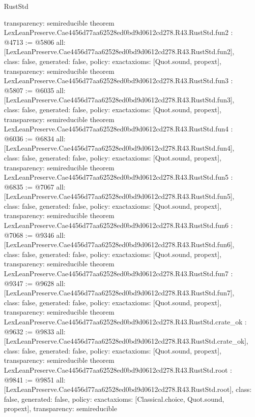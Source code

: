 \begin{lexlean}{RustStd}
\begin{coremodule}
{  transparency: semireducible
}
theorem LexLeanPreserve.Cae4456d77aa62528ed0bd9d0612cd278.R43.RustStd.fun2 : @4713 := @5806 {
  all: [LexLeanPreserve.Cae4456d77aa62528ed0bd9d0612cd278.R43.RustStd.fun2],
  class: false,
  generated: false,
  policy: exact{axioms: [Quot.sound, propext]},
  transparency: semireducible
}
theorem LexLeanPreserve.Cae4456d77aa62528ed0bd9d0612cd278.R43.RustStd.fun3 : @5807 := @6035 {
  all: [LexLeanPreserve.Cae4456d77aa62528ed0bd9d0612cd278.R43.RustStd.fun3],
  class: false,
  generated: false,
  policy: exact{axioms: [Quot.sound, propext]},
  transparency: semireducible
}
theorem LexLeanPreserve.Cae4456d77aa62528ed0bd9d0612cd278.R43.RustStd.fun4 : @6036 := @6834 {
  all: [LexLeanPreserve.Cae4456d77aa62528ed0bd9d0612cd278.R43.RustStd.fun4],
  class: false,
  generated: false,
  policy: exact{axioms: [Quot.sound, propext]},
  transparency: semireducible
}
theorem LexLeanPreserve.Cae4456d77aa62528ed0bd9d0612cd278.R43.RustStd.fun5 : @6835 := @7067 {
  all: [LexLeanPreserve.Cae4456d77aa62528ed0bd9d0612cd278.R43.RustStd.fun5],
  class: false,
  generated: false,
  policy: exact{axioms: [Quot.sound, propext]},
  transparency: semireducible
}
theorem LexLeanPreserve.Cae4456d77aa62528ed0bd9d0612cd278.R43.RustStd.fun6 : @7068 := @9346 {
  all: [LexLeanPreserve.Cae4456d77aa62528ed0bd9d0612cd278.R43.RustStd.fun6],
  class: false,
  generated: false,
  policy: exact{axioms: [Quot.sound, propext]},
  transparency: semireducible
}
theorem LexLeanPreserve.Cae4456d77aa62528ed0bd9d0612cd278.R43.RustStd.fun7 : @9347 := @9628 {
  all: [LexLeanPreserve.Cae4456d77aa62528ed0bd9d0612cd278.R43.RustStd.fun7],
  class: false,
  generated: false,
  policy: exact{axioms: [Quot.sound, propext]},
  transparency: semireducible
}
theorem LexLeanPreserve.Cae4456d77aa62528ed0bd9d0612cd278.R43.RustStd.crate_ok : @9632 := @9833 {
  all: [LexLeanPreserve.Cae4456d77aa62528ed0bd9d0612cd278.R43.RustStd.crate_ok],
  class: false,
  generated: false,
  policy: exact{axioms: [Quot.sound, propext]},
  transparency: semireducible
}
theorem LexLeanPreserve.Cae4456d77aa62528ed0bd9d0612cd278.R43.RustStd.root : @9841 := @9851 {
  all: [LexLeanPreserve.Cae4456d77aa62528ed0bd9d0612cd278.R43.RustStd.root],
  class: false,
  generated: false,
  policy: exact{axioms: [Classical.choice, Quot.sound, propext]},
  transparency: semireducible
}


\end{coremodule}
\end{lexlean}
